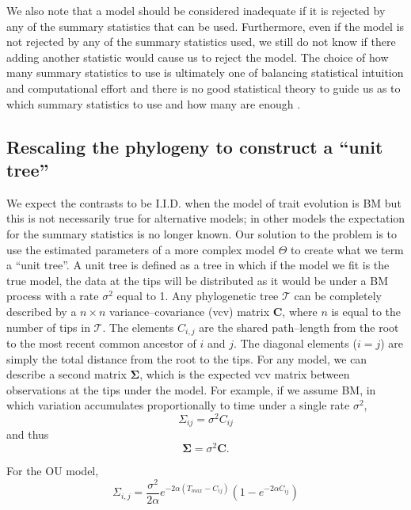 \documentclass[a4paper,12pt]{article}
\begin{document}
We also note that a model should be considered inadequate if it is rejected by any of the summary statistics that can be used. Furthermore, even if the model is not rejected by any of the summary statistics used, we still do not know if there adding another statistic would cause us to reject the model. The choice of how many summary statistics to use is ultimately one of balancing statistical intuition and computational effort and there is no good statistical theory to guide us as to which summary statistics to use and how many are enough \citep{Gelmanbook}.

\subsection*{Rescaling the phylogeny to construct a ``unit tree''}

We expect the contrasts to be I.I.D. when the model of trait evolution is BM but this is not necessarily true for alternative models; in other models the expectation for the summary statistics is no longer known. Our solution to the problem is to use the estimated parameters of a more complex model $\Theta$ to create what we term a ``unit tree''. A unit tree is defined as a tree in which if the model we fit is the true model, the data at the tips will be distributed as it would be under a BM process with a rate $\sigma^2$ equal to 1. Any phylogenetic tree $\mathcal{T}$ can be completely described by a $n \times n$ variance--covariance (vcv) matrix $\mathbf{C}$, where $n$ is equal to the number of tips in $\mathcal{T}$. The elements $C_{i,j}$ are the shared path--length from the root to the most recent common ancestor of $i$ and $j$. The diagonal elements ($i = j$) are simply the total distance from the root to the tips. For any model, we can describe a second matrix $\mathbf{\Sigma}$, which is the expected vcv matrix between observations at the tips under the model. For example, if we assume BM, in which variation accumulates proportionally to time under a single rate $\sigma^2$,
\begin{equation}
\Sigma_{ij} = \sigma^2 C_{ij}
\end{equation}
and thus
\begin{equation}
\mathbf{\Sigma} = \sigma^2 \mathbf{C}.
\end{equation}

For the OU model, 
\begin{equation}
\Sigma_{i,j} = \frac{\sigma^2}{2\alpha} e^{-2\alpha (T_{max} - C_{ij})} (1 - e^{-2\alpha C_{ij}})
\end{equation}
\end{document}
